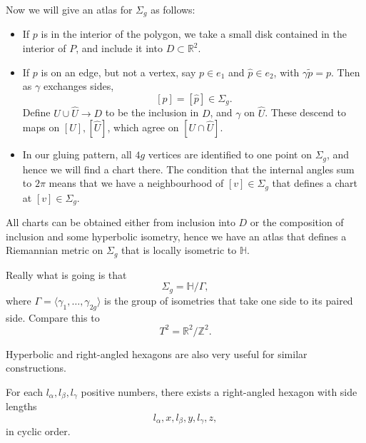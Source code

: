 \documentclass[12pt]{article}
\begin{document}
\begin{proofbox}
	Now we will give an atlas for $\Sigma_g$ as follows:
	\begin{itemize}
		\item If $p$ is in the interior of the polygon, we take a small disk contained in the interior of $P$, and include it into $D \subset \mathbb{R}^2$.
		\item If $p$ is on an edge, but not a vertex, say $p \in e_1$ and $\hat p \in e_2$, with $\gamma \tilde p = p$. Then as $\gamma$ exchanges sides,
			\[
				[p] = [\hat p] \in \Sigma_g.
			\]
			Define $U \cup \hat U \to D$ to be the inclusion in $D$, and $\gamma$ on $\hat U$. These descend to maps on $[U], [\hat U]$, which agree on $[U \cap \hat U]$.
		\item In our gluing pattern, all $4g$ vertices are identified to one point on $\Sigma_g$, and hence we will find a chart there. The condition that the internal angles sum to $2\pi$ means that we have a neighbourhood of $[v] \in \Sigma_g$ that defines a chart at $[v] \in \Sigma_g$.
	\end{itemize}
	All charts can be obtained either from inclusion into $D$ or the composition of inclusion and some hyperbolic isometry, hence we have an atlas that defines a Riemannian metric on $\Sigma_g$ that is locally isometric to $\mathbb{H}$.
\end{proofbox}

\begin{remark}
	Really what is going is that
	\[
	\Sigma_g = \mathbb{H} / \Gamma,
	\]
	where $\Gamma = \langle \gamma_1, \ldots, \gamma_{2g} \rangle$ is the group of isometries that take one side to its paired side. Compare this to 
	\[
	T^2 = \mathbb{R}^2 / \mathbb{Z}^2.
	\]
\end{remark}

Hyperbolic and right-angled hexagons are also very useful for similar constructions.

\begin{lemma}
	For each $l_\alpha, l_\beta, l_\gamma$ positive numbers, there exists a right-angled hexagon with side lengths
	\[
	l_\alpha, x, l_\beta, y, l_\gamma, z,
	\]
	in cyclic order.
\end{lemma}
\end{document}
